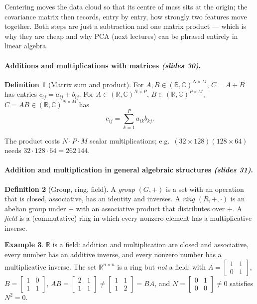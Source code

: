 \documentclass[11pt,a4paper]{article}
\newcommand{\R}{\mathbb{R}}
\newcommand{\C}{\mathbb{C}}
\newcommand{\slides}[1]{\texorpdfstring{\emph{(slides #1)}}{(slides #1)}}
\theoremstyle{definition}
\newtheorem{definition}{Definition}[section]
\newtheorem{example}[definition]{Example}
\theoremstyle{plain}
\begin{document}
\begin{intuition}
Centering moves the data cloud so that its centre of mass sits at the origin; the covariance matrix then records, entry by entry, how strongly two features move together. Both steps are just a subtraction and one matrix product --- which is why they are cheap and why PCA (next lectures) can be phrased entirely in linear algebra.
\end{intuition}

\paragraph{Additions and multiplications with matrices \slides{30}.}
\begin{definition}[Matrix sum and product]
For $A,B\in(\R,\C)^{N\times M}$, $C=A+B$ has entries $c_{ij}=a_{ij}+b_{ij}$. For $A\in(\R,\C)^{N\times P}$, $B\in(\R,\C)^{P\times M}$, $C=AB\in(\R,\C)^{N\times M}$ has
\[
c_{ij}=\sum_{k=1}^{P}a_{ik}b_{kj}.
\]
\end{definition}

The product costs $N\cdot P\cdot M$ scalar multiplications; e.g.\ $(32\times128)(128\times64)$ needs $32\cdot128\cdot64=262\,144$.

\paragraph{Addition and multiplication in general algebraic structures \slides{31}.}
\begin{definition}[Group, ring, field]
A \emph{group} $(G,+)$ is a set with an operation that is closed, associative, has an identity and inverses. A \emph{ring} $(R,+,\cdot)$ is an abelian group under $+$ with an associative product that distributes over $+$. A \emph{field} is a (commutative) ring in which every nonzero element has a multiplicative inverse.
\end{definition}

\begin{example}
$\R$ is a field: addition and multiplication are closed and associative, every number has an additive inverse, and every nonzero number has a multiplicative inverse. The set $\R^{n\times n}$ is a ring but \emph{not} a field: with $A=\begin{bmatrix}1&1\\0&1\end{bmatrix}$, $B=\begin{bmatrix}1&0\\1&1\end{bmatrix}$, $AB=\begin{bmatrix}2&1\\1&1\end{bmatrix}\neq\begin{bmatrix}1&1\\1&2\end{bmatrix}=BA$, and $N=\begin{bmatrix}0&1\\0&0\end{bmatrix}\ne0$ satisfies $N^2=0$.
\end{example}
\end{document}
